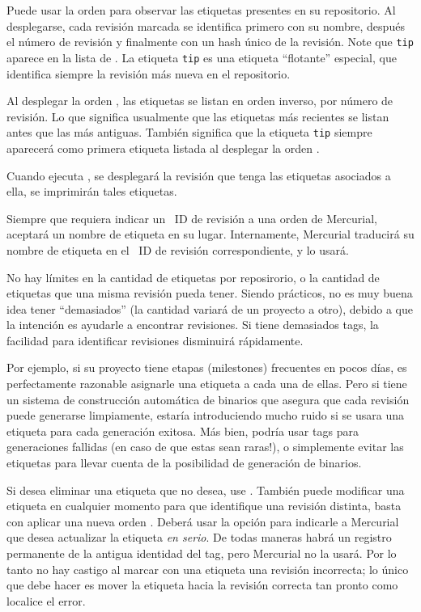 Puede usar la orden  para observar las etiquetas presentes en
su repositorio. Al desplegarse, cada revisión marcada se identifica
primero con su nombre, después el número de revisión y finalmente con
un hash único de la revisión.
Note que \texttt{tip} aparece en la lista de . La etiqueta
\texttt{tip} es una etiqueta ``flotante'' especial, que identifica siempre
la revisión más nueva en el repositorio.

Al desplegar la orden , las etiquetas se listan en orden
inverso, por número de revisión. Lo que significa usualmente que las etiquetas más recientes se listan antes que las más antiguas. También
significa que la etiqueta \texttt{tip} siempre aparecerá como primera
etiqueta listada al desplegar la orden .

Cuando ejecuta , se desplegará la revisión que tenga las etiquetas asociados a ella, se imprimirán tales etiquetas.

Siempre que requiera indicar un ~ID de revisión a una orden de
Mercurial, aceptará un nombre de etiqueta en su lugar.  Internamente,
Mercurial traducirá su nombre de etiqueta en el ~ID de revisión
correspondiente, y lo usará.

No hay límites en la cantidad de etiquetas por reposirorio, o la cantidad
de etiquetas que una misma revisión pueda tener. Siendo prácticos, no es
muy buena idea tener ``demasiados'' (la cantidad variará de un
proyecto a otro), debido a que la intención es ayudarle a encontrar
revisiones. Si tiene demasiados tags, la facilidad para identificar
revisiones disminuirá rápidamente.

Por ejemplo, si su proyecto tiene etapas (milestones) frecuentes en pocos
días, es perfectamente razonable asignarle una etiqueta a cada una de
ellas. Pero si tiene un sistema de construcción automática de binarios
que asegura que cada revisión puede generarse limpiamente, estaría
introduciendo mucho ruido si se usara una etiqueta para cada generación
exitosa. Más bien, podría usar tags para generaciones fallidas (en
caso de que estas sean raras!), o simplemente evitar las etiquetas para
llevar cuenta de la posibilidad de generación de binarios.


Si desea eliminar una etiqueta que no desea, use
.  
También puede modificar una etiqueta en cualquier momento para que
identifique una revisión distinta, basta con aplicar una nueva orden
. Deberá usar la opción  para indicarle a
Mercurial que desea actualizar la etiqueta \emph{en serio}.
De todas maneras habrá un registro permanente de la antigua identidad
del tag, pero Mercurial no la usará. Por lo tanto no hay castigo al
marcar con una etiqueta una revisión incorrecta; lo único que debe hacer es
mover la etiqueta hacia la revisión correcta tan pronto como localice el
error.

